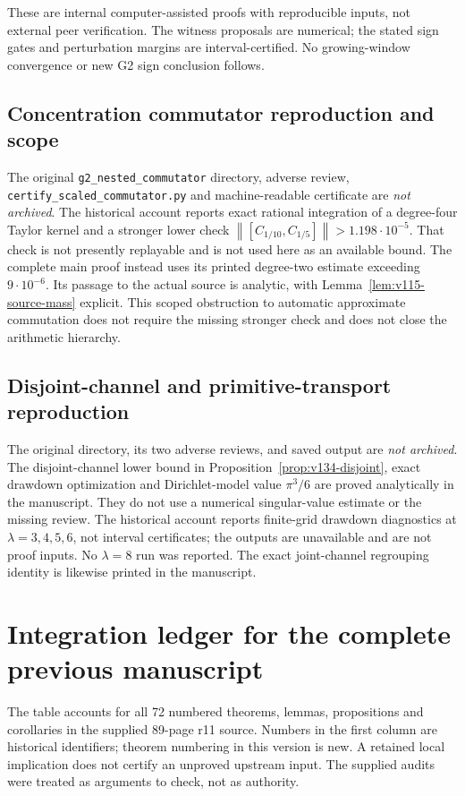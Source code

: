 \documentclass[11pt]{article}
\theoremstyle{remark}
\newcommand{\norm}[1]{\left\lVert #1\right\rVert}
\begin{document}
These are internal computer-assisted proofs with reproducible inputs,
not external peer verification. The witness proposals are numerical;
the stated sign gates and perturbation margins are interval-certified.
No growing-window convergence or new G2 sign conclusion follows.

\subsection*{Concentration commutator reproduction and scope}
The original \texttt{g2\_nested\_commutator} directory, adverse review,
\texttt{certify\_scaled\_commutator.py} and machine-readable certificate
are \emph{not archived}. The historical account reports exact rational
integration of a degree-four Taylor kernel and a stronger lower check
$\norm{[C_{1/10},C_{1/5}]}>1.198\cdot10^{-5}$. That check is not
presently replayable and is not used here as an available bound.
The complete main proof instead uses its printed degree-two estimate
exceeding $9\cdot10^{-6}$. Its passage to the actual source is analytic,
with Lemma~\ref{lem:v115-source-mass} explicit. This scoped obstruction
to automatic approximate commutation does not require the missing
stronger check and does not close the arithmetic hierarchy.

\subsection*{Disjoint-channel and primitive-transport reproduction}
The original  directory, its two adverse
reviews,  and saved output are
\emph{not archived}. The disjoint-channel lower bound in
Proposition~\ref{prop:v134-disjoint}, exact drawdown optimization and
Dirichlet-model value $\pi^3/6$ are proved analytically in the manuscript.
They do not use a numerical singular-value estimate or the missing review.
The historical account reports finite-grid drawdown diagnostics at
$\lambda=3,4,5,6$, not interval certificates; the outputs are unavailable
and are not proof inputs. No $\lambda=8$ run was reported. The exact
joint-channel regrouping identity is likewise printed in the manuscript.

\section{Integration ledger for the complete previous manuscript}\label{app:ledger}
The table accounts for all 72 numbered theorems, lemmas, propositions and
corollaries in the supplied 89-page r11 source. Numbers in the first column
are historical identifiers; theorem numbering in this version is new.
A retained local implication does not certify an unproved upstream input.
The supplied audits were treated as arguments to check, not as authority.
\end{document}
